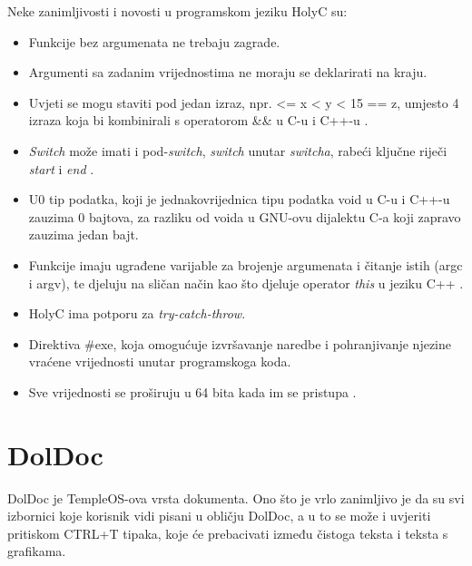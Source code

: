 \documentclass{foi}
\begin{document}
Neke zanimljivosti i novosti u programskom jeziku HolyC su:
\begin{itemize}
    \item Funkcije bez argumenata ne trebaju zagrade.

    \item Argumenti sa zadanim vrijednostima ne moraju se deklarirati na kraju.

    \item Uvjeti se mogu staviti pod jedan izraz, npr. { <= x < y < 15 == z}, umjesto 4 izraza koja bi kombinirali s operatorom {\selectfont \&\&} u C-u i C++-u \cite{HolyC}.

    \item \emph{Switch} može imati i pod-\emph{switch}, \emph{switch} unutar \emph{switcha}, rabeći ključne riječi \emph{start} i \emph{end} \cite{HolyC}.

    \item {\selectfont U0} tip podatka, koji je jednakovrijednica tipu podatka {\selectfont void} u C-u i C++-u zauzima 0 bajtova, za razliku od {\selectfont voida} u GNU-ovu dijalektu C-a koji zapravo zauzima jedan bajt.

    \item Funkcije imaju ugrađene varijable za brojenje argumenata i čitanje istih ({\selectfont argc} i {\selectfont argv}), te djeluju na sličan način kao što djeluje operator \emph{this} u jeziku C++ \cite{HolyC}.

    \item HolyC ima potporu za \emph{try-catch-throw}.

    \item Direktiva {\selectfont \#exe}, koja omogućuje izvršavanje naredbe i pohranjivanje njezine vraćene vrijednosti unutar programskoga koda.

    \item Sve vrijednosti se proširuju u 64 bita kada im se pristupa \cite{HolyC}.

\end{itemize}

\section{DolDoc}

DolDoc je TempleOS-ova vrsta dokumenta. Ono što je vrlo zanimljivo je da su svi izbornici koje korisnik vidi pisani u obličju DolDoc, a u to se može i uvjeriti pritiskom {\selectfont CTRL+T} tipaka, koje će prebacivati između čistoga teksta i teksta s grafikama.
\end{document}
